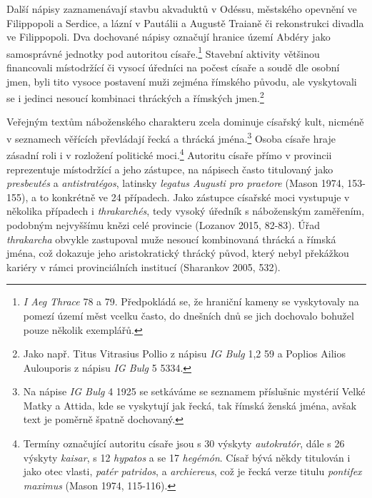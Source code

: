 Další nápisy zaznamenávají stavbu akvaduktů v Odéssu, městského opevnění ve Filippopoli a Serdice, a lázní v Pautálii a Augustě Traianě či rekonstrukci divadla ve Filippopoli. Dva dochované nápisy označují hranice území Abdéry jako samosprávné jednotky pod autoritou císaře.\footnote{{\em I Aeg Thrace} 78 a 79. Předpokládá se, že hraniční kameny se vyskytovaly na pomezí území měst vcelku často, do dnešních dnů se jich dochovalo bohužel pouze několik exemplářů.} Stavební aktivity většinou financovali místodržící či vysocí úředníci na počest císaře a soudě dle osobní jmen, byli tito vysoce postavení muži zejména římského původu, ale vyskytovali se i jedinci nesoucí kombinaci thráckých a římských jmen.\footnote{Jako např. Titus Vitrasius Pollio z nápisu {\em IG Bulg} 1,2 59 a Poplios Ailios Aulouporis z nápisu {\em IG Bulg} 5 5334.}

Veřejným textům náboženského charakteru zcela dominuje císařský kult, nicméně v seznamech věřících převládají řecká a thrácká jména.\footnote{Na nápise {\em IG Bulg} 4 1925 se setkáváme se seznamem příslušnic mystérií Velké Matky a Attida, kde se vyskytují jak řecká, tak římská ženská jména, avšak text je poměrně špatně dochovaný.} Osoba císaře hraje zásadní roli i v rozložení politické moci.\footnote{Termíny označující autoritu císaře jsou s 30 výskyty {\em autokratór}, dále s 26 výskyty {\em kaisar}, s 12 {\em hypatos} a se 17 {\em hegémón}. Císař bývá někdy titulován i jako otec vlasti, {\em patér patridos}, a {\em archiereus}, což je řecká verze titulu {\em pontifex maximus} (Mason 1974, 115-116).} Autoritu císaře přímo v provincii reprezentuje místodržící a jeho zástupce, na nápisech často titulovaný jako {\em presbeutés} a {\em antistratégos}, latinsky {\em legatus Augusti pro praetore} (Mason 1974, 153-155), a to konkrétně ve 24 případech. Jako zástupce císařské moci vystupuje v několika případech i {\em thrakarchés}, tedy vysoký úředník s náboženským zaměřením, podobným nejvyššímu knězi celé provincie (Lozanov 2015, 82-83). Úřad {\em thrakarcha} obvykle zastupoval muže nesoucí kombinovaná thrácká a římská jména, což dokazuje jeho aristokratický thrácký původ, který nebyl překážkou kariéry v rámci provinciálních institucí (Sharankov 2005, 532).

